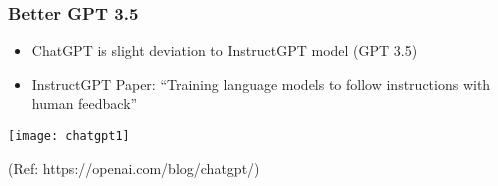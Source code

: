 





\begin{frame}[fragile]\frametitle{Better GPT 3.5}

\begin{itemize}
\item ChatGPT is slight deviation to InstructGPT model (GPT 3.5)
\item InstructGPT Paper: ``Training language models to follow instructions with human feedback''
\end{itemize}	 

\begin{center}
\texttt{[image: chatgpt1]}
\end{center}		

\tiny{(Ref: https://openai.com/blog/chatgpt/)}
\end{frame}

